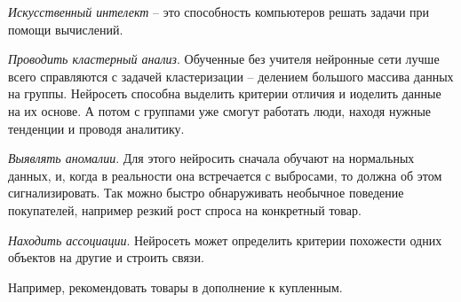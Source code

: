 \begin{definition}
  \emph{Искусственный интелект} -- это способность компьютеров решать задачи при помощи вычислений.
\end{definition}

\emph{Проводить кластерный анализ}. Обученные без учителя нейронные сети лучше всего справляются с задачей кластеризации -- делением большого массива данных на группы. Нейросеть способна выделить критерии отличия и иоделить данные на их основе. А потом с группами уже смогут работать люди, находя нужные тенденции и проводя аналитику. 

\emph{Выявлять аномалии}. Для этого нейросить сначала обучают на нормальных данных, и, когда в реальности она встречается с выбросами, то должна об этом сигнализировать. Так можно быстро обнаруживать необычное поведение покупателей, например резкий рост спроса на конкретный товар.

\emph{Находить ассоциации}. Нейросеть может определить критерии похожести одних объектов на другие и строить связи.

Например, рекомендовать товары в дополнение к купленным.
